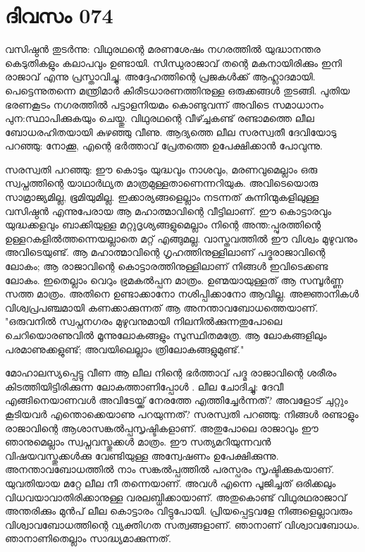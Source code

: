  
\section{ദിവസം 074}


വസിഷ്ഠന്‍ തുടര്‍ന്നു: വിഥുരഥന്റെ മരണശേഷം നഗരത്തില്‍ യുദ്ധാനന്തര കെടുതികളും കലാപവും ഉണ്ടായി. സിന്ധുരാജാവ്‌ തന്റെ മകനായിരിക്കും ഇനി രാജാവ്‌ എന്നു പ്രസ്താവിച്ചു. അദ്ദേഹത്തിന്റെ പ്രജകള്‍ക്ക്‌ ആഹ്ലാദമായി. പെട്ടെന്നുതന്നെ മന്ത്രിമാര്‍ കിരീടധാരണത്തിനുള്ള ഒരുക്കങ്ങള്‍ തുടങ്ങി. പുതിയ ഭരണകൂടം നഗരത്തില്‍ പട്ടാളനിയമം കൊണ്ടുവന്ന് അവിടെ സമാധാനം പുന:സ്ഥാപിക്കുകയും ചെയ്തു. വിഥുരഥന്റെ വീഴ്ച്ചകണ്ട്‌ രണ്ടാമത്തെ ലീല ബോധരഹിതയായി കുഴഞ്ഞു വീണു. ആദ്യത്തെ ലീല സരസ്വതീ ദേവിയോടു പറഞ്ഞു: നോക്കൂ, എന്റെ ഭര്‍ത്താവ്‌ പ്രേതത്തെ ഉപേക്ഷിക്കാന്‍ പോവുന്നു.

സരസ്വതി പറഞ്ഞു: ഈ കൊടും യുദ്ധവും നാശവും, മരണവുമെല്ലാം ഒരു സ്വപ്നത്തിന്റെ യാഥാര്‍ഥ്യത മാത്രമുള്ളതാണെന്നറിയുക. അവിടെയൊരു സാമ്രാജ്യമില്ല, ഭൂമിയുമില്ല. ഇക്കാര്യങ്ങളെല്ലാം നടന്നത്‌ കുന്നിന്മുകളിലുള്ള വസിഷ്ഠന്‍ എന്നുപേരായ ആ മഹാത്മാവിന്റെ വീട്ടിലാണ്‌. ഈ കൊട്ടാരവും യുദ്ധക്കളവും ബാക്കിയുള്ള മറ്റുദൃശ്യങ്ങളുമെല്ലാം നിന്റെ അന്ത:പ്പുരത്തിന്റെ ഉള്ളറകളില്‍ത്തന്നെയല്ലാതെ  മറ്റ് എങ്ങുമല്ല. വാസ്തവത്തില്‍ ഈ വിശ്വം മുഴുവനും അവിടെയുണ്ട്‌. ആ മഹാത്മാവിന്റെ  ഗൃഹത്തിനുള്ളിലാണ്‌ പദ്മരാജാവിന്റെ ലോകം; ആ രാജാവിന്റെ കൊട്ടാരത്തിനുള്ളിലാണ്‌ നിങ്ങള്‍ ഇവിടെക്കണ്ട ലോകം. ഇതെല്ലാം വെറും ഭ്രമകല്‍പ്പന മാത്രം. ഉണ്മയായുള്ളത്‌ ആ സമ്പൂര്‍ണ്ണ സത്ത മാത്രം. അതിനെ ഉണ്ടാക്കാനോ നശിപ്പിക്കാനോ ആവില്ല. അജ്ഞാനികള്‍ വിശ്വപ്രപഞ്ചമായി കണക്കാക്കുന്നത്‌ ആ അനന്താവബോധത്തെയാണ്‌. "ഒരുവനില്‍ സ്വപ്നനഗരം മുഴുവനുമായി നിലനില്‍ക്കുന്നതുപോലെ ചെറിയൊരണുവില്‍ മൂന്നുലോകങ്ങളും സുസ്ഥിതമത്രേ. ആ ലോകങ്ങളിലും പരമാണുക്കളുണ്ട്‌; അവയിലെല്ലാം ത്രിലോകങ്ങളുമുണ്ട്‌."

മോഹാലസ്യപ്പെട്ടു വീണ ആ ലീല നിന്റെ ഭര്‍ത്താവ്‌ പദ്മ രാജാവിന്റെ ശരീരം കിടത്തിയിട്ടിരിക്കുന്ന ലോകത്താണിപ്പോള്‍ . ലീല ചോദിച്ചു: ദേവീ എങ്ങിനെയാണവള്‍ അവിടേയ്ക്ക്‌ നേരത്തേ എത്തിച്ചേര്‍ന്നത്‌? അവളോട്‌ ചുറ്റും കൂടിയവര്‍ എന്തൊക്കെയാണു പറയുന്നത്‌? സരസ്വതി പറഞ്ഞു: നിങ്ങള്‍ രണ്ടാളും രാജാവിന്റെ ആശാസങ്കല്‍പ്പസൃഷ്ടികളാണ്‌. അതുപോലെ രാജാവും ഈ ഞാനുമെല്ലാം സ്വപ്നവസ്തുക്കള്‍ മാത്രം. ഈ സത്യമറിയുന്നവന്‍ വിഷയവസ്തുക്കള്‍ക്കു വേണ്ടിയുള്ള അന്വേഷണം ഉപേക്ഷിക്കുന്നു. അനന്താവബോധത്തില്‍ നാം സങ്കല്‍പ്പത്തില്‍ പരസ്പരം സൃഷ്ടിക്കുകയാണ്‌. യുവതിയായ മറ്റേ ലീല നീ തന്നെയാണ്‌. അവള്‍ എന്നെ പൂജിച്ചത്‌ ഒരിക്കലും വിധവയാവാതിരിക്കാനുള്ള വരലബ്ധിക്കായാണ്‌. അതുകൊണ്ട്‌ വിഥുരഥരാജാവ്‌ അന്തരിക്കും മുന്‍പ്‌ ലീല കൊട്ടാരം വിട്ടുപോയി. പ്രിയപ്പെട്ടവളേ നിങ്ങളെല്ലാവരും വിശ്വാവബോധത്തിന്റെ വ്യക്തിഗത സത്വങ്ങളാണ്‌. ഞാനാണ്‌ വിശ്വാവബോധം. ഞാനാണിതെല്ലാം സാദ്ധ്യമാക്കുന്നത്‌.

